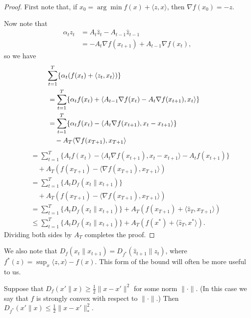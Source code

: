 \documentclass{article}
\begin{document}
\begin{proof}
First note that, if $x_0 = \arg\min f(x) + \langle z, x \rangle$, 
then $\nabla f(x_0) = -z$.


Now note that
\begin{align}
\alpha_{t}z_{t} 
&= A_{t}\hat z_{t} - A_{t-1}\hat z_{t-1} \\
&= - A_{t}\nabla f(x_{t+1}) + A_{t-1} \nabla f(x_{t}),
\end{align}
so we have
\begin{align}
\lefteqn{\sum_{t=1}^T \{\alpha_t(f(x_t) + \langle z_t, x_t \rangle)\}} \\
 &= \sum_{t=1}^T \{\alpha_t f(x_t) + \langle A_{t-1} \nabla f(x_t) - A_t \nabla f(x_{t+1}), x_t \rangle\} \\
 &= \sum_{t=1}^T \{\alpha_t f(x_t) - \langle A_{t} \nabla f(x_{t+1}), x_t-x_{t+1} \rangle\} \\
 & \quad - A_{T}\langle \nabla f(x_{T+1}), x_{T+1} \rangle
\end{align}
\begin{align}
 &= \sum_{t=1}^T \{A_t f(x_t) - \langle A_{t} \nabla f(x_{t+1}), x_t-x_{t+1} \rangle - A_t f(x_{t+1})\}  \\
 &\quad+ A_T(f(x_{T+1}) - \langle \nabla f(x_{T+1}), x_{T+1} \rangle) \nonumber \\
 &= \sum_{t=1}^T \{A_tD_f(x_t \| x_{t+1})\}  \\
 &\quad+ A_T(f(x_{T+1}) - \langle \nabla f(x_{T+1}), x_{T+1} \rangle) \nonumber \\
 &= \sum_{t=1}^T \{A_tD_f(x_t \| x_{t+1})\} + A_T(f(x_{T+1}) + \langle \hat{z}_T, x_{T+1} \rangle) \\
 &\leq \sum_{t=1}^T \{A_tD_f(x_t \| x_{t+1})\} + A_T(f(x^*) + \langle \hat{z}_T, x^* \rangle). 
\end{align}
Dividing both sides by $A_T$ completes the proof.
\end{proof}
We also note that $D_f(x_t \| x_{t+1}) = D_{f^*}(\hat{z}_{t+1} \| z_t)$, where $f^*(z) = \sup_x \langle z,x\rangle - f(x)$. 
This form of the bound will often be more useful to us.
\begin{lemma}
\label{lem:convexity}
Suppose that $D_f(x' \| x) \geq \frac{1}{2}\|x-x'\|^2$ for some 
norm $\|\cdot\|$. (In this case we say that $f$ is strongly 
convex with respect to $\|\cdot\|$.) 
Then $D_{f^*}(x' \| x) \leq \frac{1}{2}\|x-x'\|_{*}^2$.
\end{lemma}
\end{document}
